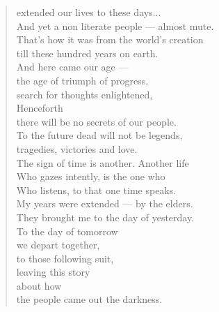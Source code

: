 \documentclass[smalldemyvopaper,11pt,twoside,onecolumn,openright,extrafontsizes]{memoir}
\begin{document}
\begin{verse}
extended our lives to these days...\\
And yet a non literate people — almost mute.\\
That's how it was from the world's creation\\
till these hundred years on earth.\\
And here came our age —\\
the age of triumph of progress,\\
search for thoughts enlightened, \\
Henceforth\\
there will be no secrets of our people.\\
To the future dead will not be legends,\\
tragedies, victories and love.\\
The sign of time is another. Another life \\
Who gazes intently, is the one who \\ 
Who listens, to that one time speaks.\\
My years were extended — by the elders.\\
They brought me to the day of yesterday.\\
To the day of tomorrow\\
we depart together,\\
to those following suit,\\
leaving this story\\
about how\\
the people came out the darkness.
\end{verse}

\clearpage
\tableofcontents

\mainmatter
\end{document}
